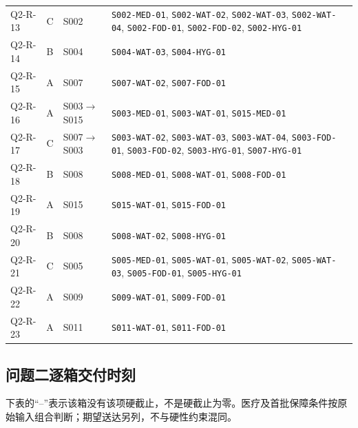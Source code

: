 \documentclass[withoutpreface,colorprint]{format}
\numberwithin{equation}{section}
\numberwithin{figure}{section}
\numberwithin{table}{section}
\begin{document}
\begin{longtable}{@{}lc>{\raggedright\arraybackslash}p{2.8cm}>{\raggedright\arraybackslash}p{8.8cm}@{}}
Q2-R-13 & C & S002 & \texttt{S002-MED-01}\allowbreak, \texttt{S002-WAT-02}\allowbreak, \texttt{S002-WAT-03}\allowbreak, \texttt{S002-WAT-04}\allowbreak, \texttt{S002-FOD-01}\allowbreak, \texttt{S002-FOD-02}\allowbreak, \texttt{S002-HYG-01}\allowbreak\\
Q2-R-14 & B & S004 & \texttt{S004-WAT-03}\allowbreak, \texttt{S004-HYG-01}\allowbreak\\
Q2-R-15 & A & S007 & \texttt{S007-WAT-02}\allowbreak, \texttt{S007-FOD-01}\allowbreak\\
Q2-R-16 & A & S003$\to$S015 & \texttt{S003-MED-01}\allowbreak, \texttt{S003-WAT-01}\allowbreak, \texttt{S015-MED-01}\allowbreak\\
Q2-R-17 & C & S007$\to$S003 & \texttt{S003-WAT-02}\allowbreak, \texttt{S003-WAT-03}\allowbreak, \texttt{S003-WAT-04}\allowbreak, \texttt{S003-FOD-01}\allowbreak, \texttt{S003-FOD-02}\allowbreak, \texttt{S003-HYG-01}\allowbreak, \texttt{S007-HYG-01}\allowbreak\\
Q2-R-18 & B & S008 & \texttt{S008-MED-01}\allowbreak, \texttt{S008-WAT-01}\allowbreak, \texttt{S008-FOD-01}\allowbreak\\
Q2-R-19 & A & S015 & \texttt{S015-WAT-01}\allowbreak, \texttt{S015-FOD-01}\allowbreak\\
Q2-R-20 & B & S008 & \texttt{S008-WAT-02}\allowbreak, \texttt{S008-HYG-01}\allowbreak\\
Q2-R-21 & C & S005 & \texttt{S005-MED-01}\allowbreak, \texttt{S005-WAT-01}\allowbreak, \texttt{S005-WAT-02}\allowbreak, \texttt{S005-WAT-03}\allowbreak, \texttt{S005-FOD-01}\allowbreak, \texttt{S005-HYG-01}\allowbreak\\
Q2-R-22 & A & S009 & \texttt{S009-WAT-01}\allowbreak, \texttt{S009-FOD-01}\allowbreak\\
Q2-R-23 & A & S011 & \texttt{S011-WAT-01}\allowbreak, \texttt{S011-FOD-01}\allowbreak\\
\bottomrule
\end{longtable}


\subsection{问题二逐箱交付时刻}
下表的“--”表示该箱没有该项硬截止，不是硬截止为零。医疗及首批保障条件按原始输入组合判断；期望送达另列，不与硬性约束混同。
\end{document}
